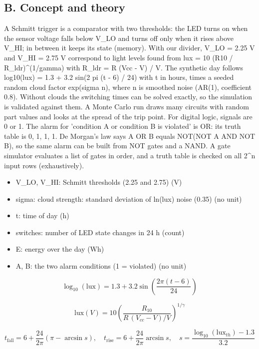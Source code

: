 \documentclass[11pt,a4paper]{article}
\begin{document}
\subsection*{B. Concept and theory}
A Schmitt trigger is a comparator with two thresholds: the LED turns on when the sensor voltage falls below V\_LO and turns off only when it rises above V\_HI; in between it keeps its state (memory). With our divider, V\_LO = 2.25 V and V\_HI = 2.75 V correspond to light levels found from lux = 10 (R10 / R\_ldr)\textasciicircum{}(1/gamma) with R\_ldr = R (Vcc - V) / V. The synthetic day follows log10(lux) = 1.3 + 3.2 sin(2 pi (t - 6) / 24) with t in hours, times a seeded random cloud factor exp(sigma n), where n is smoothed noise (AR(1), coefficient 0.8). Without clouds the switching times can be solved exactly, so the simulation is validated against them. A Monte Carlo run draws many circuits with random part values and looks at the spread of the trip point. For digital logic, signals are 0 or 1. The alarm for 'condition A or condition B is violated' is OR: its truth table is 0, 1, 1, 1. De Morgan's law says A OR B equals NOT(NOT A AND NOT B), so the same alarm can be built from NOT gates and a NAND. A gate simulator evaluates a list of gates in order, and a truth table is checked on all 2\textasciicircum{}n input rows (exhaustively).

\begin{itemize}[nosep]
\item V\_LO, V\_HI: Schmitt thresholds (2.25 and 2.75) (V)
\item sigma: cloud strength: standard deviation of ln(lux) noise (0.35) (no unit)
\item t: time of day (h)
\item switches: number of LED state changes in 24 h (count)
\item E: energy over the day (Wh)
\item A, B: the two alarm conditions (1 = violated) (no unit)
\end{itemize}

\begin{equation*}
\log_{10}(\text{lux})=1.3+3.2\sin\!\left(\frac{2\pi (t-6)}{24}\right)
\end{equation*}

\begin{equation*}
\text{lux}(V)=10\left(\frac{R_{10}}{R\,(V_{cc}-V)/V}\right)^{1/\gamma}
\end{equation*}

\begin{equation*}
t_{\text{fall}}=6+\frac{24}{2\pi}\left(\pi-\arcsin s\right),\quad t_{\text{rise}}=6+\frac{24}{2\pi}\arcsin s,\quad s=\frac{\log_{10}(\text{lux}_{th})-1.3}{3.2}
\end{equation*}
\end{document}
